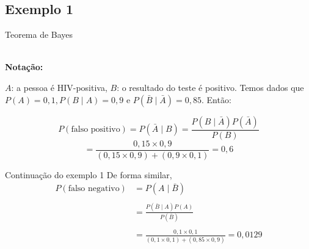 \documentclass{beamer}
\theoremstyle{definition}
\begin{document}
\subsection{Exemplo 1}
\begin{frame}{Teorema de Bayes}

 \\

\textbf{Notação:}

$A$: a pessoa é HIV-positiva,
$B$: o resultado do teste é positivo.
Temos dados que $P(A)=0,1,P(B\mid A)=0,9$ e $P(\bar{B}\mid\bar{A})=0,85$. Então:

$$P(\text{falso positivo})=P(\bar{A} \mid B)=\frac{P(B \mid \bar{A}) P(\bar{A})}{P(B)}$$ 
$$=\frac{0,15 \times 0,9}{(0,15 \times 0,9)+(0,9 \times 0,1)}=0,6$$

\end{frame}

\begin{frame}{Continuação do exemplo 1}
De forma similar,
$$
\begin{aligned}
P(\text {falso negativo}) & =P(A \mid \bar{B}) \\ \\
& =\frac{P(\bar{B} \mid A) P(A)}{P(\bar{B})} \\ \\
& =\frac{0,1 \times 0,1}{(0,1 \times 0,1)+(0,85 \times 0,9)}=0,0129
\end{aligned}
$$
\end{frame}
\end{document}
